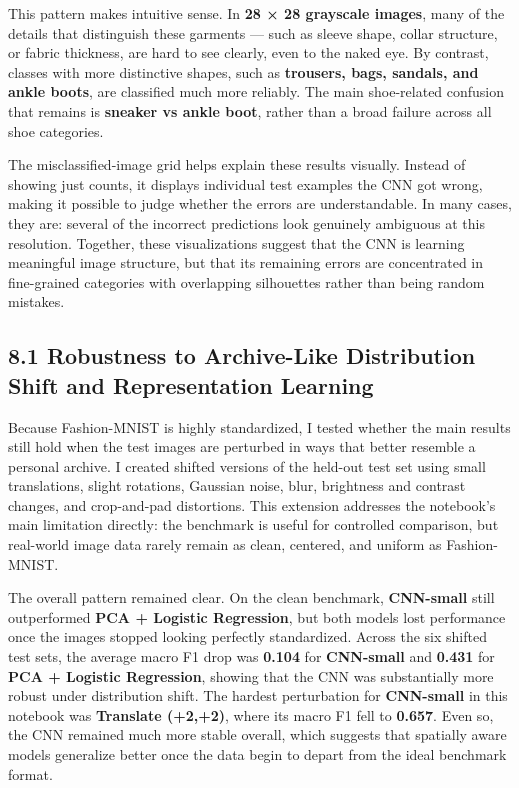 \documentclass[11pt]{article}
\begin{document}
This pattern makes intuitive sense. In \textbf{28 × 28 grayscale
images}, many of the details that distinguish these garments --- such as
sleeve shape, collar structure, or fabric thickness, are hard to see
clearly, even to the naked eye. By contrast, classes with more
distinctive shapes, such as \textbf{trousers, bags, sandals, and ankle
boots}, are classified much more reliably. The main shoe-related
confusion that remains is \textbf{sneaker vs ankle boot}, rather than a
broad failure across all shoe categories.

The misclassified-image grid helps explain these results visually.
Instead of showing just counts, it displays individual test examples the
CNN got wrong, making it possible to judge whether the errors are
understandable. In many cases, they are: several of the incorrect
predictions look genuinely ambiguous at this resolution. Together, these
visualizations suggest that the CNN is learning meaningful image
structure, but that its remaining errors are concentrated in
fine-grained categories with overlapping silhouettes rather than being
random mistakes.

    \subsection{8.1 Robustness to Archive-Like Distribution Shift and
Representation
Learning}\label{robustness-to-archive-like-distribution-shift-and-representation-learning}

Because Fashion-MNIST is highly standardized, I tested whether the main
results still hold when the test images are perturbed in ways that
better resemble a personal archive. I created shifted versions of the
held-out test set using small translations, slight rotations, Gaussian
noise, blur, brightness and contrast changes, and crop-and-pad
distortions. This extension addresses the notebook's main limitation
directly: the benchmark is useful for controlled comparison, but
real-world image data rarely remain as clean, centered, and uniform as
Fashion-MNIST.

The overall pattern remained clear. On the clean benchmark,
\textbf{CNN-small} still outperformed \textbf{PCA + Logistic
Regression}, but both models lost performance once the images stopped
looking perfectly standardized. Across the six shifted test sets, the
average macro F1 drop was \textbf{0.104} for \textbf{CNN-small} and
\textbf{0.431} for \textbf{PCA + Logistic Regression}, showing that the
CNN was substantially more robust under distribution shift. The hardest
perturbation for \textbf{CNN-small} in this notebook was
\textbf{Translate (+2,+2)}, where its macro F1 fell to \textbf{0.657}.
Even so, the CNN remained much more stable overall, which suggests that
spatially aware models generalize better once the data begin to depart
from the ideal benchmark format.
\end{document}
